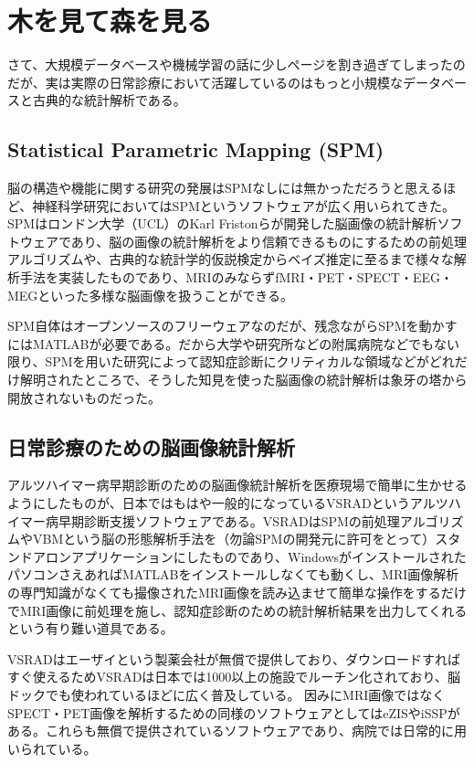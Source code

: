 \section{木を見て森を見る}
さて、大規模データベースや機械学習の話に少しページを割き過ぎてしまったのだが、実は実際の日常診療において活躍しているのはもっと小規模なデータベースと古典的な統計解析である。

\subsection{Statistical Parametric Mapping (SPM)}
脳の構造や機能に関する研究の発展はSPMなしには無かっただろうと思えるほど、神経科学研究においてはSPMというソフトウェアが広く用いられてきた。SPMはロンドン大学（UCL）のKarl Fristonらが開発した脳画像の統計解析ソフトウェアであり、脳の画像の統計解析をより信頼できるものにするための前処理アルゴリズムや、古典的な統計学的仮説検定からベイズ推定に至るまで様々な解析手法を実装したものであり、MRIのみならずfMRI・PET・SPECT・EEG・MEGといった多様な脳画像を扱うことができる。

SPM自体はオープンソースのフリーウェアなのだが、残念ながらSPMを動かすにはMATLABが必要である。だから大学や研究所などの附属病院などでもない限り、SPMを用いた研究によって認知症診断にクリティカルな領域などがどれだけ解明されたところで、そうした知見を使った脳画像の統計解析は象牙の塔から開放されないものだった。
\subsection{日常診療のための脳画像統計解析}
アルツハイマー病早期診断のための脳画像統計解析を医療現場で簡単に生かせるようにしたものが、日本ではもはや一般的になっているVSRADというアルツハイマー病早期診断支援ソフトウェアである。VSRADはSPMの前処理アルゴリズムやVBMという脳の形態解析手法を（勿論SPMの開発元に許可をとって）スタンドアロンアプリケーションにしたものであり、WindowsがインストールされたパソコンさえあればMATLABをインストールしなくても動くし、MRI画像解析の専門知識がなくても撮像されたMRI画像を読み込ませて簡単な操作をするだけでMRI画像に前処理を施し、認知症診断のための統計解析結果を出力してくれるという有り難い道具である。

VSRADはエーザイという製薬会社が無償で提供しており、ダウンロードすればすぐ使えるためVSRADは日本では1000以上の施設でルーチン化されており、脳ドックでも使われているほどに広く普及している。
因みにMRI画像ではなくSPECT・PET画像を解析するための同様のソフトウェアとしてはeZISやiSSPがある。これらも無償で提供されているソフトウェアであり、病院では日常的に用いられている。

